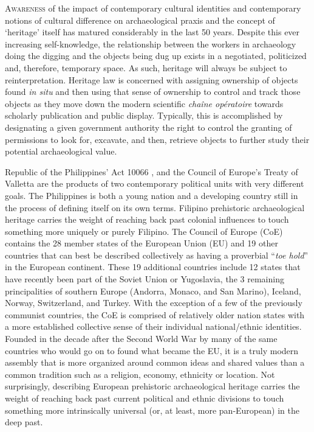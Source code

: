 \documentclass[english]{ijsra}
\begin{document}
\IJSRAopening
\lettrine{A}{wareness} of the impact of contemporary cultural identities and contemporary notions of cultural difference on archaeological praxis and the concept of ‘heritage’ itself has matured considerably in the last 50 years. Despite this ever increasing self-knowledge, the relationship between the workers in archaeology  doing the digging and the objects being dug up exists in a negotiated, politicized and, therefore, temporary space. As such, heritage will always be subject to reinterpretation. Heritage law is concerned with assigning ownership of objects found \textit{in situ} and then using that sense of ownership to control and track those objects as they move down the modern scientific \textit{chaîne opératoire} towards scholarly publication and public display. Typically, this is accomplished by designating a given government authority the right to control the granting of permissions to look for, excavate, and then, retrieve objects to further study their potential archaeological value.

Republic of the Philippines’ Act 10066 \parencite{RA10066}, and the Council of Europe’s Treaty of Valletta \parencite{Valletta_1992} are the products of two contemporary political units with very different goals. The Philippines is both a young nation and a developing country still in the process of defining itself on its own terms. 
Filipino prehistoric archaeological heritage carries the weight of reaching back past colonial influences to touch something more uniquely or purely Filipino. The Council of Europe (CoE) contains the 28 member states of the European Union (EU) and 19 other countries that can best be described collectively as having a proverbial “\textit{toe hold}” in the European continent. 
These 19 additional countries include 12 states that have recently been part of the Soviet Union or Yugoslavia, the 3 remaining principalities of southern Europe (Andorra, Monaco, and San Marino), Iceland, Norway, Switzerland, and Turkey.  With the exception of a few of the previously communist countries, the CoE is comprised of relatively older nation states with a more established collective sense of their individual national/ethnic identities. Founded in the decade after the Second World War by many of the same countries who would go on to found what became the EU, it is a truly modern assembly that is more organized around common ideas and shared values than a common tradition such as a religion, economy, ethnicity or location. Not surprisingly, describing European prehistoric archaeological heritage carries the weight of reaching back past current political and ethnic divisions to touch something more intrinsically universal (or, at least, more pan-European) in the deep past. 
 
\end{document}
